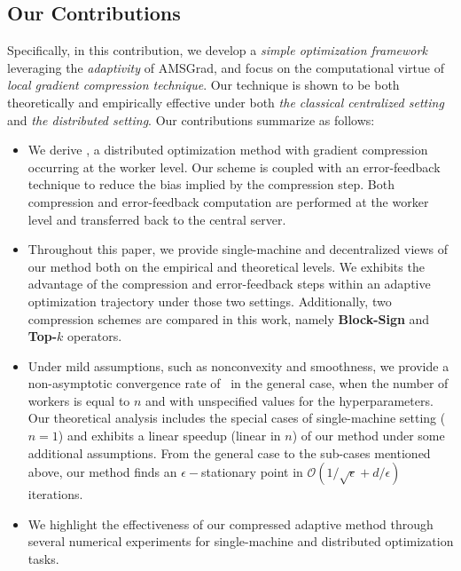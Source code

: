 \documentclass[11pt]{article}
\begin{document}
\vspace{-0.05in}
\subsection{Our Contributions}
\vspace{-0.05in}

Specifically, in this contribution, we develop a \emph{simple optimization framework} leveraging the \emph{adaptivity} of AMSGrad, and focus on the computational virtue of \emph{local gradient compression technique}.
Our technique is shown to be both theoretically and empirically effective under both \emph{the classical centralized setting} and \emph{the distributed setting}.
Our contributions summarize as follows:
\begin{itemize}
\item We derive \algo, a distributed optimization method with gradient compression occurring at the worker level. Our scheme is coupled with an error-feedback technique to reduce the bias implied by the compression step. Both compression and error-feedback computation are performed at the worker level and transferred back to the central server.
\item Throughout this paper, we provide single-machine and decentralized views of our method both on the empirical and theoretical levels.
We exhibits the advantage of the compression and error-feedback steps within an adaptive optimization trajectory under those two settings.
Additionally, two compression schemes are compared in this work, namely \textbf{Block-Sign} and \textbf{Top-$k$} operators.
\item Under mild assumptions, such as nonconvexity and smoothness, we provide a non-asymptotic convergence rate of \algo\ in the general case, \ie when the number of workers is equal to $n$ and with unspecified values for the hyperparameters. 
Our theoretical analysis includes the special cases of single-machine setting ($n=1$) and exhibits a linear speedup (linear in $n$) of our method under some additional assumptions.
From the general case to the sub-cases mentioned above, our method finds an $\epsilon-$stationary point in $\mathcal O(1/\sqrt{\epsilon}+d/\epsilon)$ iterations.
\item We highlight the effectiveness of our compressed adaptive method through several numerical experiments for single-machine and distributed optimization tasks.
\end{itemize}
\end{document}
